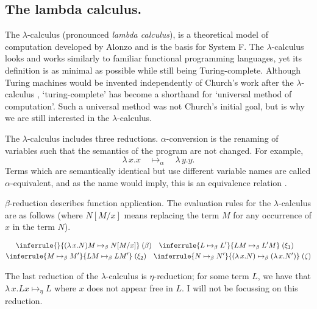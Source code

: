 \subsection{The lambda calculus.}
The $\lambda$-calculus (pronounced \textit{lambda calculus}), is a theoretical model of computation
developed by Alonzo \citet{church_set_1932} and is the basis for System F. The $\lambda$-calculus
looks and works similarly to familiar functional programming languages, yet its definition is as
minimal as possible while still being Turing-complete. Although Turing machines would be invented
independently of Church's work after the $\lambda$-calculus \citep{turing_computable_1937},
`turing-complete' has become a shorthand for `universal method of computation'. Such a universal
method was not Church's initial goal, but is why we are still interested in the $\lambda$-calculus.

The $\lambda$-calculus includes three reductions. $\alpha$-conversion is the renaming of variables
such that the semantics of the program are not changed. For example,
\begin{equation*}
  \lambda \, x. x \quad \mapsto_{\alpha} \quad \lambda \, y. y.
\end{equation*}
Terms which are semantically identical but use different variable names are called
$\alpha$-equivalent, and as the name would imply, this is an equivalence relation
\citep{pierce_types_2002}.

$\beta$-reduction describes function application. The evaluation rules for the $\lambda$-calculus
are as follows \citep{wadler_programming_2022} (where $N[M/x]$ means replacing the term $M$ for any
occurrence of $x$ in the term $N$).

\begin{equation}
\label{equation:untyped_beta_rules}
\begin{gathered}
  \inferrule{ }{(\lambda \, x. N)M \mapsto_{\beta} N[M/x]} \; (\beta) \quad
  \inferrule{L \mapsto_{\beta} L'}{LM \mapsto_{\beta} L'M} \; (\xi_1) \quad\\
  \inferrule{M \mapsto_{\beta} M'}{LM \mapsto_{\beta} LM'} \; (\xi_2) \quad
  \inferrule
    {N \mapsto_{\beta} N'}
    {(\lambda \, x. N) \mapsto_{\beta} (\lambda \, x. N')} \; (\zeta)
\end{gathered}
\end{equation}

The last reduction of the $\lambda$-calculus is $\eta$-reduction; for some term $L$, we have that
$\lambda \, x. L x \mapsto_{\eta} L$ where $x$ does not appear free in $L$. I will not be focussing
on this reduction.


